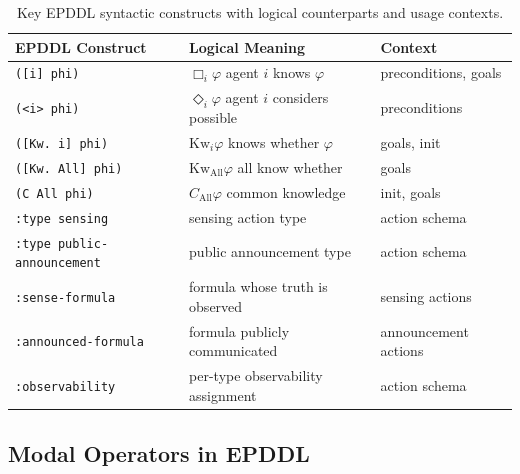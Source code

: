 \documentclass[12pt,a4paper]{article}
\theoremstyle{definition}
\theoremstyle{plain}
\begin{document}
\begin{table}[H]
\centering
\begin{tabular}{lll}
\toprule
\textbf{EPDDL Construct} & \textbf{Logical Meaning} & \textbf{Context} \\
\midrule
\texttt{([i] phi)}           & $\Box_i \varphi$   agent $i$ knows $\varphi$        & preconditions, goals \\
\texttt{(<i> phi)}           & $\Diamond_i \varphi$   agent $i$ considers possible  & preconditions \\
\texttt{([Kw. i] phi)}       & $\mathrm{Kw}_i \varphi$   knows whether $\varphi$   & goals, init \\
\texttt{([Kw. All] phi)}     & $\mathrm{Kw}_\mathrm{All} \varphi$   all know whether & goals \\
\texttt{(C All phi)}         & $C_\mathrm{All} \varphi$   common knowledge          & init, goals \\
\texttt{:type sensing}       & sensing action type                                    & action schema \\
\texttt{:type public-announcement} & public announcement type                         & action schema \\
\texttt{:sense-formula}      & formula whose truth is observed                        & sensing actions \\
\texttt{:announced-formula}  & formula publicly communicated                          & announcement actions \\
\texttt{:observability}      & per-type observability assignment                      & action schema \\
\bottomrule
\end{tabular}
\caption{Key EPDDL syntactic constructs with logical counterparts and usage contexts.}
\label{tab:epddlsyntax}
\end{table}

\subsection{Modal Operators in EPDDL}
\end{document}
